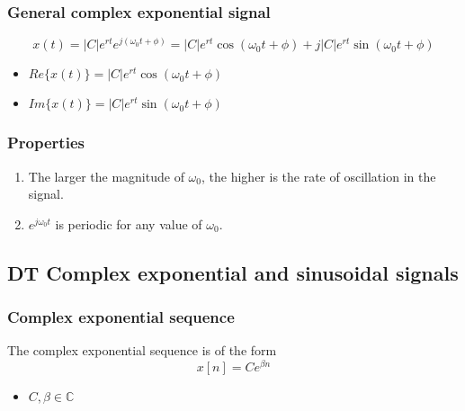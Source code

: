     \subsubsection{General complex exponential signal}
    \begin{definition}
        \begin{equation}
            x(t) = |C| e^{rt} e^{j(\omega_0 t + \phi)} = |C| e^{rt} \cos(\omega_0 t + \phi) + j |C| e^{rt} \sin(\omega_0 t + \phi)
        \end{equation}
        \begin{itemize}
            \item $Re\{x(t)\} = |C| e^{rt} \cos(\omega_0 t + \phi)$
            \item $Im\{x(t)\} = |C| e^{rt} \sin(\omega_0 t + \phi)$
        \end{itemize}

    \end{definition}

    \subsubsection{Properties}
    \begin{definition}
        \begin{enumerate}
            \item The larger the magnitude of \(\omega_0\), the higher is the rate of oscillation in the signal.
            \item \(e^{j\omega_0 t}\) is periodic for any value of \(\omega_0\).
        \end{enumerate}
    \end{definition}

\subsection{DT Complex exponential and sinusoidal signals}
    \subsubsection{Complex exponential sequence}
    \begin{definition}
        The complex exponential sequence is of the form
        \begin{equation}
            x[n] = Ce^{\beta n}
        \end{equation}
        \begin{itemize}
            \item $C,\beta \in \mathbb{C}$
        \end{itemize}
    \end{definition}

